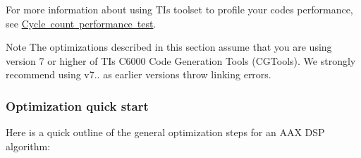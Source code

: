 For more information about using TI\textquotesingle{}s toolset to profile your code\textquotesingle{}s performance, see \mbox{\hyperlink{a00835_subsection__cyclessharedtest}{Cycle count performance test}}.

\begin{DoxyNote}{Note}
The optimizations described in this section assume that you are using version 7 or higher of TI\textquotesingle{}s C6000 Code Generation Tools (C\+G\+Tools). We strongly recommend using v7.. as earlier versions throw linking errors.
\end{DoxyNote}
\hypertarget{a00832_subsection__optimization_quick_start}{}\subsubsection{Optimization quick start}\label{a00832_subsection__optimization_quick_start}
Here is a quick outline of the general optimization steps for an A\+AX D\+SP algorithm\+: 
